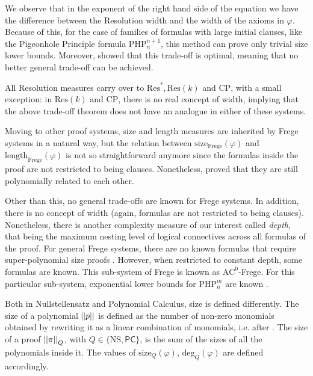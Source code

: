 We observe that in the exponent of the right hand side of the equation we have the difference between the Resolution width and the width of the axioms in $\varphi$. Because of this, for the case of families of formulas with large initial clauses, like the Pigeonhole Principle formula $\mathrm{PHP}^{n+1}_n$, this method can prove only trivial size lower bounds. Moreover, \textcite{galesi_optim} showed that this trade-off is optimal, meaning that no better general trade-off can be achieved. 

All Resolution measures carry over to $\mathrm{Res}^*, \mathrm{Res}(k)$ and $\mathrm{CP}$, with a small exception: in $\mathrm{Res}(k)$ and $\mathrm{CP}$, there is no real concept of width, implying that the above trade-off theorem does not have an analogue in either of these systems. 

Moving to other proof systems, size and length measures are inherited by Frege systems in a natural way, but the relation between $\mathrm{size}_{\mathrm{Frege}}(\varphi)$ and $\mathrm{length}_{\mathrm{Frege}}(\varphi)$ is not so straightforward anymore since the formulas inside the proof are not restricted to being clauses. Nonetheless, \textcite{reckhow} proved that they are still polynomially related to each other.

Other than this, no general trade-offs are known for Frege systems. In addition, there is no concept of width (again, formulas are not restricted to being clauses). Nonetheless, there is another complexity measure of our interest called \textit{depth}, that being the maximum nesting level of logical connectives across all formulas of the proof. For general Frege systems, there are no known formulas that require super-polynomial size proofs \cite{php_easy}. However, when restricted to constant depth, some formulas are known. This sub-system of Frege is known as $\mathrm{AC}^0$-Frege. For this particular sub-system, exponential lower bounds for $\mathrm{PHP}^m_n$ are known \cite{hastad, php_lower, php_lower_2}.

Both in Nullstellensatz and Polynomial Calculus, size is defined differently. The size of a polynomial $\left|\left|p\right|\right|$ is defined as the number of non-zero monomials obtained by rewriting it as a linear combination of monomials, i.e. after . The size of a proof $\left|\left|\pi\right|\right|_Q$, with $Q \in \{\mathrm{NS}, \mathsf{PC}\}$, is the sum of the sizes of all the polynomials inside it. The values of $\mathrm{size}_{Q}(\varphi)$, $\mathrm{deg}_{Q}(\varphi)$ are defined accordingly. 

